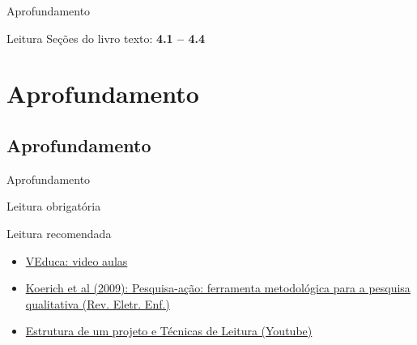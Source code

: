 \documentclass{beamer}
\begin{document}
\begin{frame}{Aprofundamento}
  \begin{block}{Leitura}
    Seções do livro texto: {\bf 4.1 -- 4.4}
  \end{block}
\end{frame}

\section{Aprofundamento}

\subsection{Aprofundamento}

\begin{frame}{Aprofundamento}
  \begin{block}{Leitura obrigatória}
  \end{block}
  \begin{block}{Leitura recomendada}
    \begin{itemize}
      \scriptsize
    \item<1-> \href{http://www.veduca.com.br/assistir/metodologia-cientifica}
      {VEduca: video aulas}
    \item<1-> \href{http://www.veduca.com.br/assistir/metodologia-cientifica}
      {Koerich et al (2009): Pesquisa-ação: ferramenta
      metodológica para a pesquisa qualitativa (Rev. Eletr. Enf.)}
  \item<1-> \href{http://www.veduca.com.br/assistir/metodologia-cientifica}
    {Estrutura de um projeto e Técnicas de Leitura (Youtube)}
    \end{itemize}
  \end{block}
\end{frame}
\end{document}
